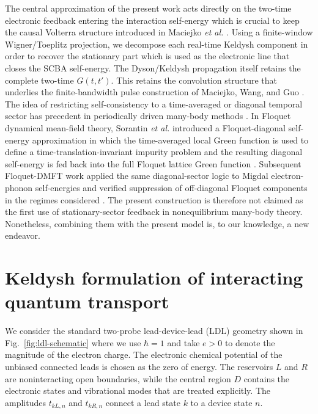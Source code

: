 \documentclass[
 reprint,
 superscriptaddress,
 amsmath,amssymb,
 aps,prb,
 longbibliography,
 floatfix
]{revtex4-2}
\begin{document}
The central approximation of the present work acts directly on the two-time electronic feedback entering the interaction self-energy which is crucial to keep the causal Volterra structure introduced in Maciejko \textit{et al.} \cite{MaciejkoWangGuo2006}. Using a finite-window Wigner/Toeplitz projection, we decompose each real-time Keldysh component in order to recover the stationary part which is used as the electronic line that closes the SCBA self-energy. The Dyson/Keldysh propagation itself retains the complete two-time \(G(t,t')\). This retains the convolution structure that underlies the finite-bandwidth pulse construction of Maciejko, Wang, and Guo \cite{MaciejkoWangGuo2006}. The idea of restricting self-consistency to a time-averaged or diagonal temporal sector has precedent in periodically driven many-body methods \cite{AokiEtAl2014}. In Floquet dynamical mean-field theory, Sorantin \textit{et al.} introduced a Floquet-diagonal self-energy approximation in which the time-averaged local Green function is used to define a time-translation-invariant impurity problem and the resulting diagonal self-energy is fed back into the full Floquet lattice Green function \cite{SorantinEtAl2018}. Subsequent Floquet-DMFT work applied the same diagonal-sector logic to Migdal electron-phonon self-energies and verified suppression of off-diagonal Floquet components in the regimes considered \cite{GazzaneoEtAl2022,GazzaneoArrigoni2025}. The present construction is therefore not claimed as the first use of stationary-sector feedback in nonequilibrium many-body theory. Nonetheless, combining them with the present model is, to our knowledge, a new endeavor.


\section{Keldysh formulation of interacting quantum transport}
\label{sec:model}

We consider the standard two-probe lead-device-lead (LDL) geometry shown in Fig.~\ref{fig:ldl-schematic} where we use $\hbar=1$ and take $e>0$ to denote the magnitude of the electron charge. The electronic chemical potential of the unbiased connected leads is chosen as the zero of energy. The reservoirs $L$ and $R$ are noninteracting open boundaries, while the central region $D$ contains the electronic states and vibrational modes that are treated explicitly. The amplitudes $t_{kL,n}$ and $t_{kR,n}$ connect a lead state $k$ to a device state $n$.
\end{document}
